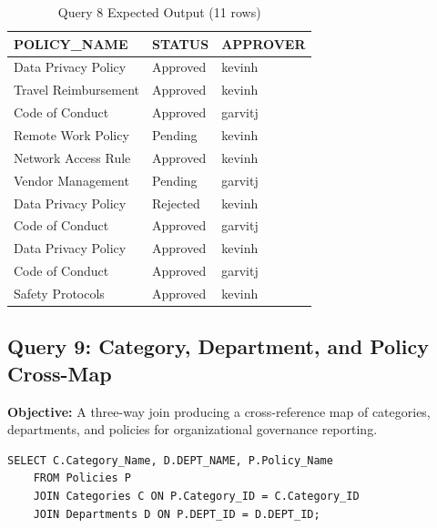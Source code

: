 \documentclass[conference]{IEEEtran}
\begin{document}
\begin{table}[H]
\centering
\caption{Query 8 Expected Output (11 rows)}
\begin{tabular}{|l|l|l|}
\hline
\textbf{POLICY\_NAME} & \textbf{STATUS} & \textbf{APPROVER} \\
\hline
Data Privacy Policy   & Approved & kevinh  \\
Travel Reimbursement  & Approved & kevinh  \\
Code of Conduct       & Approved & garvitj \\
Remote Work Policy    & Pending  & kevinh  \\
Network Access Rule   & Approved & kevinh  \\
Vendor Management     & Pending  & garvitj \\
Data Privacy Policy   & Rejected & kevinh  \\
Code of Conduct       & Approved & garvitj \\
Data Privacy Policy   & Approved & kevinh  \\
Code of Conduct       & Approved & garvitj \\
Safety Protocols      & Approved & kevinh  \\
\hline
\end{tabular}
\end{table}

\subsection{Query 9: Category, Department, and Policy Cross-Map}

\textbf{Objective:} A three-way join producing a cross-reference map of categories, departments, and policies for organizational governance reporting.

\begin{lstlisting}[style=sqlstyle, caption={Query 9: Cross-Map (Multi-JOIN)}]
SELECT C.Category_Name, D.DEPT_NAME, P.Policy_Name
    FROM Policies P
    JOIN Categories C ON P.Category_ID = C.Category_ID
    JOIN Departments D ON P.DEPT_ID = D.DEPT_ID;
\end{lstlisting}
\end{document}
